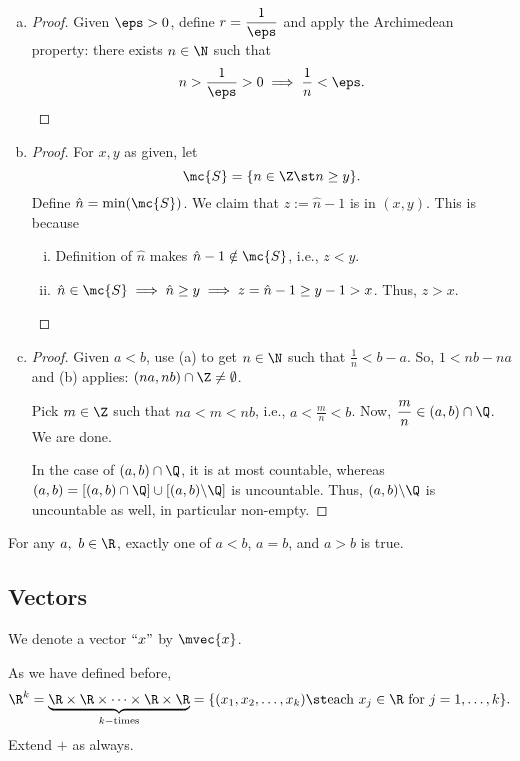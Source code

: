\begin{enumerate}[(a)]
	\item 
	\begin{proof}
		Given \(\eps>0\), define \(r=\displaystyle\frac{1}{\eps}\) and apply the Archimedean property: there exists \(n\in\N\) such that 
		\begin{equation*}
			n>\frac{1}{\eps}>0\implies\frac{1}{n}<\eps.
		\end{equation*}
	\end{proof}
	
	\item 
	\begin{proof}
		For \(x,y\) as given, let 
		\begin{equation*}
			\mc{S}=\{n\in\Z\st n\geq y\}.
		\end{equation*}
		Define \(\hat{n}=\operatorname{min}(\mc{S})\). We claim that \(z:=\hat{n}-1\) is in \((x,y)\). This is because 
		\begin{enumerate}[(i)]
			\item Definition of \(\hat{n}\) makes \(\hat{n}-1\notin\mc{S}\), i.e., \(z<y\).
			
			\item \(\hat{n}\in\mc{S}\implies \hat{n}\geq y\implies z=\hat{n}-1\geq y-1>x\). Thus, \(z>x\).
		\end{enumerate}
	\end{proof}
	
	\item 
	\begin{proof}
		Given \(a<b\), use (a) to get \(n\in\N\) such that 
		\(\displaystyle\frac{1}{n}<b-a\). So, \(1<nb-na\) and (b) applies: \((na,nb)\cap\Z\neq\emptyset\).
		
		\medskip
		
		Pick \(m\in\Z\) such that \(na<m<nb\), i.e., \(\displaystyle a<\frac{m}{n}<b\). Now, \(\displaystyle\frac{m}{n}\in(a,b)\cap\Q\). We are done.
		
		\medskip
		
		In the case of \((a,b)\cap\Q\), it is at most countable, whereas \((a,b)=[(a,b)\cap\Q]\cup[(a,b)\backslash\Q]\) is uncountable. Thus, \((a,b)\backslash\Q\) is uncountable as well, in particular non-empty. 
	\end{proof}
\end{enumerate}
\begin{property}
	For any \(a,~b\in\R\), exactly one of \(a<b\), \(a=b\), and \(a>b\) is true.
\end{property}
\subsection{Vectors}
\begin{notation}
	We denote a vector \(``x"\) by \(\mvec{x}\).
\end{notation}
As we have defined before, 
\begin{equation*}
	\R^k=\underbrace{\R\times\R\times\dots\times\R\times\R}_{k-\text{times}}=\{(x_1,x_2,\dots,x_k)\st\text{each}~x_j\in\R~\text{for}~j=1,\dots,k\}.
\end{equation*}
Extend \(+\) as always. 

